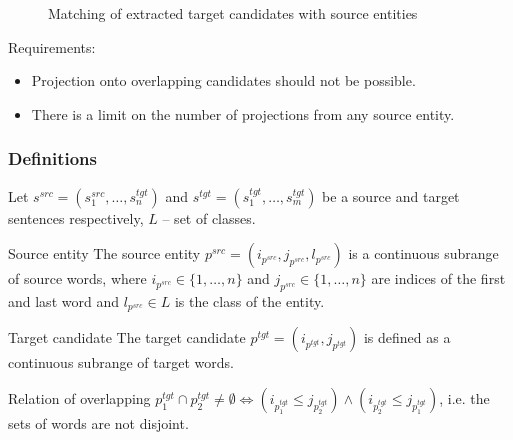 \documentclass{beamer}
\newcommand{\src}[1]{#1^{src}}
\newcommand{\tgt}[1]{#1^{tgt}}
\begin{document}
\begin{frame}
\begin{figure}
    \caption{Matching of extracted target candidates with source entities}
  \end{figure}

  Requirements:
  \begin{itemize}
    \item Projection onto overlapping candidates should not be possible.
    \item There is a limit on the number of projections from any source entity.
  \end{itemize}
\end{frame}

\begin{frame}
  \frametitle{Definitions}

  Let \( \src{s} = \left( \src{s_1}, \dots, \tgt{s_n} \right) \) and
  \( \tgt{s} = \left( \tgt{s_1}, \dots, \tgt{s_m} \right) \) be a source and target
  sentences respectively, \( L \) -- set of classes.
  \begin{block}{Source entity}
    The source entity \( \src{p} = (i_{\src{p}}, j_{\src{p}}, l_{\src{p}} ) \) is a continuous
    subrange of source words, where \( i_{\src{p}} \in \{ 1, \dots, n \} \) and
    \( j_{\src{p}} \in \{ 1, \dots, n \} \) are indices of
    the first and last word and \( l_{\src{p}} \in L \) is the class of the entity.
  \end{block}

  \begin{block}{Target candidate}
    The target candidate \( \tgt{p} = (i_{\tgt{p}}, j_{\tgt{p}}) \) is defined as a continuous
    subrange of target words.
  \end{block}

  \begin{block}{Relation of overlapping}
    \( \tgt{p_1} \cap \tgt{p_2} \neq \emptyset \Leftrightarrow
    ( i_{\tgt{p_1}} \leq j_{\tgt{p_2}} ) \land ( i_{\tgt{p_2}} \leq j_{\tgt{p_1}} ) \),
    i.e. the sets of words are not disjoint.
  \end{block}
\end{frame}
\end{document}
